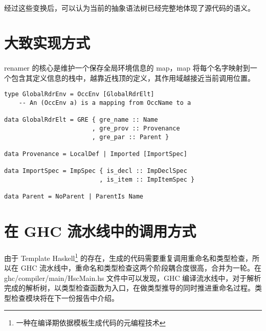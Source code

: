 \documentclass{article}
\begin{document}
	\paragraph{}
	经过这些变换后，可以认为当前的抽象语法树已经完整地体现了源代码的语义。
	\section{大致实现方式}
	\paragraph{}
	renamer 的核心是维护一个保存全局环境信息的 map，map 将每个名字映射到一个包含其定义信息的栈中，越靠近栈顶的定义，其作用域越接近当前调用位置。
\begin{verbatim}
type GlobalRdrEnv = OccEnv [GlobalRdrElt]
    -- An (OccEnv a) is a mapping from OccName to a

data GlobalRdrElt = GRE { gre_name :: Name
                        , gre_prov :: Provenance
                        , gre_par :: Parent }

data Provenance = LocalDef | Imported [ImportSpec]

data ImportSpec = ImpSpec { is_decl :: ImpDeclSpec
                          , is_item :: ImpItemSpec }

data Parent = NoParent | ParentIs Name
\end{verbatim}
	\section{在 GHC 流水线中的调用方式}
	\paragraph{}
	由于 Template Haskell\footnote{一种在编译期依据模板生成代码的元编程技术} 的存在，生成的代码需要重复调用重命名和类型检查，所以在 GHC 流水线中，重命名和类型检查这两个阶段耦合度很高，合并为一轮。在 ghc/compiler/main/HscMain.hs 文件中可以发现，GHC 编译流水线中，对于解析完成的解析树，以类型检查函数为入口，在做类型推导的同时推进重命名过程。类型检查模块将在下一份报告中介绍。
	
	

\medskip


\end{document}
